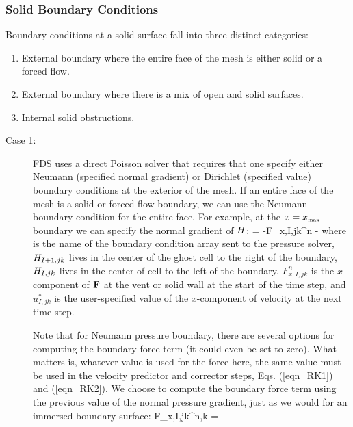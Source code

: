\subsubsection{Solid Boundary Conditions}
\label{ssub:solid_boundary_conditions}

Boundary conditions at a solid surface fall into three distinct categories:
\begin{enumerate}
\item External boundary where the entire face of the mesh is either solid or a forced flow.
\item External boundary where there is a mix of open and solid surfaces.
\item Internal solid obstructions.
\end{enumerate}

\begin{description}
\item[Case 1:] FDS uses a direct Poisson solver that requires that one specify either Neumann (specified normal gradient) or Dirichlet (specified value) boundary conditions at the exterior of the mesh. If an entire face of the mesh is a solid or forced flow boundary, we can use the Neumann boundary condition for the entire face. For example, at the $x=x_{\hbox{\tiny max}}$ boundary we can specify the normal gradient of $H$:
\be
{} \equiv {} = -F_{x,I,jk}^n - 
\label{dbc}
\ee
where  is the name of the boundary condition array sent to the pressure solver, $H_{I+1,jk}$ lives in the center of the ghost cell to the right of the boundary, $H_{I,jk}$ lives in the center of cell to the left of the boundary, $F_{x,I,jk}^n$ is the $x$-component of ${\mathbf{F}}$ at the vent or solid wall at the start of the time step, and $u_{I,jk}^*$ is the user-specified value of the $x$-component of velocity at the next time step.

Note that for Neumann pressure boundary, there are several options for computing the boundary force term (it could even be set to zero).  What matters is, whatever value is used for the force here, the same value must be used in the velocity predictor and corrector steps, Eqs. (\ref{eqn_RK1}) and (\ref{eqn_RK2}).  We choose to compute the boundary force term using the previous value of the normal pressure gradient, just as we would for an immersed boundary surface:
\be
F_{x,I,jk}^{n,k} =  -  - 
\label{Fboundary}
\ee


\end{description}
